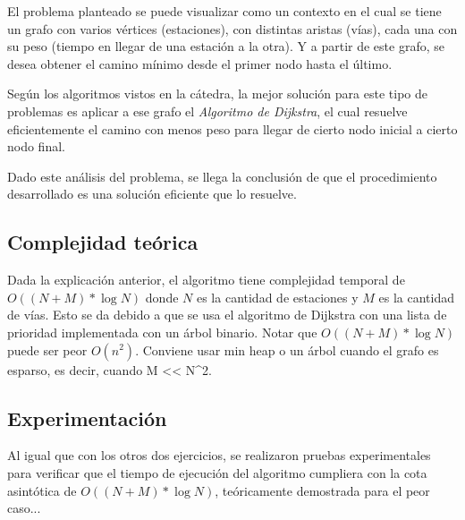     \par El problema planteado se puede visualizar como un contexto en el cual se tiene un grafo con varios vértices (estaciones), con distintas aristas (vías), cada una con su peso (tiempo en llegar de una estación a la otra). Y a partir de este grafo, se desea obtener el camino mínimo desde el primer nodo hasta el último.
    \par Según los algoritmos vistos en la cátedra, la mejor solución para este tipo de problemas es aplicar a ese grafo el \emph{Algoritmo de Dijkstra}, el cual resuelve eficientemente el camino con menos peso para llegar de cierto nodo inicial a cierto nodo final.
    \par Dado este análisis del problema, se llega la conclusión de que el procedimiento desarrollado es una solución eficiente que lo resuelve.
   
    \subsection{Complejidad teórica}
        Dada la explicación anterior, el algoritmo tiene complejidad temporal de $O((N+M) * \log N)$ donde $N$ es la cantidad de estaciones y $M$ es la cantidad de vías.
        Esto se da debido a que se usa el algoritmo de Dijkstra con una lista de prioridad implementada con un árbol binario.
        Notar que $O((N+M) * \log N)$ puede ser peor $O(n^{2})$. Conviene usar min heap o un árbol cuando el grafo es esparso, es decir, cuando M << N^{2}.
    


    \subsection{Experimentación}

        Al igual que con los otros dos ejercicios, se realizaron pruebas experimentales para verificar que el tiempo de ejecución del algoritmo cumpliera con la cota asintótica de $O((N+M) * \log N)$, teóricamente demostrada para el peor caso...